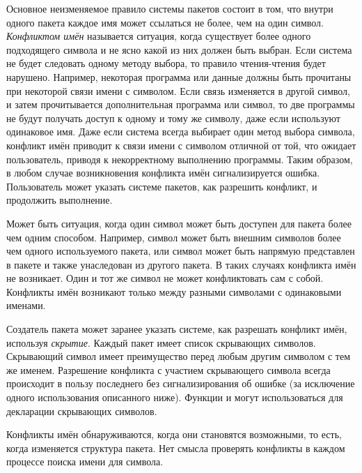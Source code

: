 Основное неизменяемое правило системы пакетов состоит в том, что внутри одного
пакета каждое имя может ссылаться не более, чем на один символ.
\emph{Конфликтом имён} называется ситуация, когда существует более одного
подходящего символа и не ясно какой из них должен быть выбран. Если система не
будет следовать одному методу выбора, то правило чтения-чтения будет
нарушено. Например, некоторая программа или данные должны быть прочитаны при
некоторой связи имени с символом. Если связь изменяется в другой
символ, и затем прочитывается дополнительная программа или символ, то две
программы не будут получать доступ к одному и тому же символу, даже если
используют одинаковое имя. Даже если система всегда выбирает один метод выбора
символа, конфликт имён приводит к связи имени с символом отличной от той,
что ожидает пользователь, приводя к некорректному выполнению программы. Таким
образом, в любом случае возникновения конфликта имён сигнализируется
ошибка. Пользователь может указать системе пакетов, как разрешить конфликт, и
продолжить выполнение.

Может быть ситуация, когда один символ может быть доступен для пакета более чем
одним способом. Например, символ может быть внешним символов более чем одного
используемого пакета, или символ может быть напрямую представлен в пакете и
также унаследован из другого пакета.
В таких случаях конфликта имён не возникает.
Один и тот же символ не может конфликтовать сам с собой.
Конфликты имён возникают только между разными символами с одинаковыми именами.

Создатель пакета может заранее указать системе, как разрешать конфликт
имён, используя \emph{скрытие}. Каждый пакет имеет список скрывающих
символов. Скрывающий символ имеет преимущество перед любым другим
символом с тем же именем. Разрешение конфликта с участием скрывающего
символа всегда происходит в пользу последнего без сигнализирования об
ошибке (за исключение одного использования  описанного
ниже). Функции  и  могут
использоваться для декларации скрывающих символов.

Конфликты имён обнаруживаются, когда они становятся возможными, то есть, когда
изменяется структура пакета. Нет смысла проверять конфликты в каждом процессе
поиска имени для символа.

